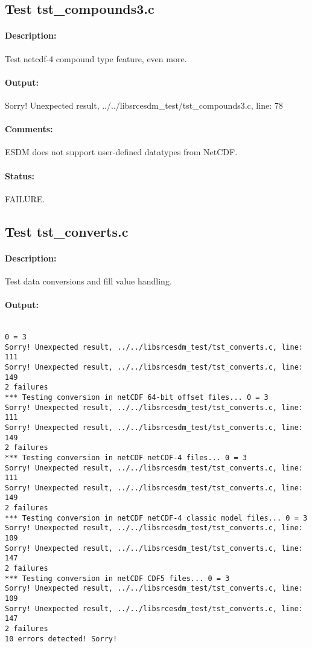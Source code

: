 \subsection{Test tst\_compounds3.c}

\paragraph{Description:} Test netcdf-4 compound type feature, even more.

\paragraph{Output:} Sorry! Unexpected result, ../../libsrcesdm\_test/tst\_compounds3.c, line: 78

\paragraph{Comments:} ESDM does not support user-defined datatypes from NetCDF.

\paragraph{Status:} FAILURE.

\subsection{Test tst\_converts.c}

\paragraph{Description:} Test data conversions and fill value handling.

\paragraph{Output:}

\begin{verbatim}

0 = 3
Sorry! Unexpected result, ../../libsrcesdm_test/tst_converts.c, line: 111
Sorry! Unexpected result, ../../libsrcesdm_test/tst_converts.c, line: 149
2 failures
*** Testing conversion in netCDF 64-bit offset files... 0 = 3
Sorry! Unexpected result, ../../libsrcesdm_test/tst_converts.c, line: 111
Sorry! Unexpected result, ../../libsrcesdm_test/tst_converts.c, line: 149
2 failures
*** Testing conversion in netCDF netCDF-4 files... 0 = 3
Sorry! Unexpected result, ../../libsrcesdm_test/tst_converts.c, line: 111
Sorry! Unexpected result, ../../libsrcesdm_test/tst_converts.c, line: 149
2 failures
*** Testing conversion in netCDF netCDF-4 classic model files... 0 = 3
Sorry! Unexpected result, ../../libsrcesdm_test/tst_converts.c, line: 109
Sorry! Unexpected result, ../../libsrcesdm_test/tst_converts.c, line: 147
2 failures
*** Testing conversion in netCDF CDF5 files... 0 = 3
Sorry! Unexpected result, ../../libsrcesdm_test/tst_converts.c, line: 109
Sorry! Unexpected result, ../../libsrcesdm_test/tst_converts.c, line: 147
2 failures
10 errors detected! Sorry!

\end{verbatim}

